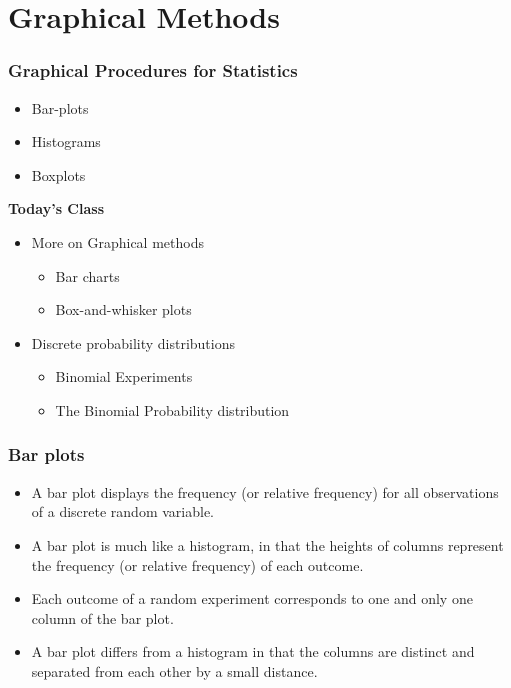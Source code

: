 \documentclass[]{report}
\begin{document}
\chapter{Graphical Methods}

{
\subsection{Graphical Procedures for Statistics}
\begin{itemize}
\item Bar-plots
\item Histograms
\item Boxplots

\end{itemize}
}
{
\textbf{Today's Class}

\begin{itemize}
\item More on Graphical methods
\begin{itemize}
\item Bar charts
\item Box-and-whisker plots
\end{itemize}
\item Discrete probability distributions
\begin{itemize}
\item Binomial Experiments
\item The Binomial Probability distribution
\end{itemize}
\end{itemize}
}

\newpage
\subsection{Bar plots}
\large
\begin{itemize} \item A bar plot displays the frequency (or relative frequency) for all observations of a discrete random variable. \item A bar plot is much like a histogram, in that the heights of columns represent the frequency (or relative frequency) of each outcome.
\item Each outcome of a random experiment corresponds to one and only one column of the bar plot.
\item A bar plot differs from a histogram in that the columns are distinct and separated from each other by a small distance.
\end{itemize}
\end{document}
